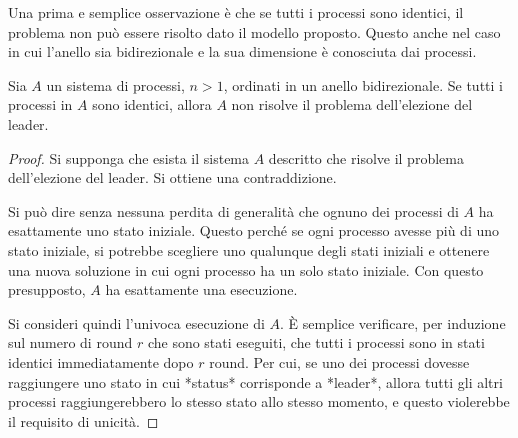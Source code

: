 \documentclass[italian,]{book}
\begin{document}
Una prima e semplice osservazione è che se tutti i processi sono
identici, il problema non può essere risolto dato il modello proposto.
Questo anche nel caso in cui l'anello sia bidirezionale e la sua
dimensione è conosciuta dai processi.

\begin{theorem} 
  
  Sia $A$ un sistema di processi, $n > 1$, ordinati in un anello bidirezionale.
  Se tutti i processi in $A$ sono identici, allora $A$ non risolve il problema
  dell'elezione del leader. 

\end{theorem}

\begin{proof}
  
Si supponga che esista il sistema $A$ descritto che risolve il problema
dell'elezione del leader. Si ottiene una contraddizione.

Si può dire senza nessuna perdita di generalità che ognuno dei processi di $A$
ha esattamente uno stato iniziale. Questo perché se ogni processo avesse più
di uno stato iniziale, si potrebbe scegliere uno qualunque degli stati
iniziali e ottenere una nuova soluzione in cui ogni processo ha un solo stato
iniziale. Con questo presupposto, $A$ ha esattamente una esecuzione.

Si consideri quindi l'univoca esecuzione di $A$. È semplice verificare, per
induzione sul numero di round $r$ che sono stati eseguiti, che tutti i
processi sono in stati identici immediatamente dopo $r$ round. Per cui, se
uno dei processi dovesse raggiungere uno stato in cui *status* corrisponde a
*leader*, allora tutti gli altri processi raggiungerebbero lo stesso stato
allo stesso momento, e questo violerebbe il requisito di unicità.

\end{proof}
\end{document}
